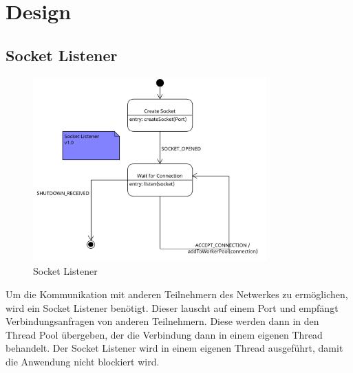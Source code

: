 \section{Design}
\subsection{Socket Listener}

\begin{figure}[H]
\centering
\includegraphics[width=0.8\textwidth]{images/socketlistener.png}
\caption{Socket Listener}
\label{fig:SocketListener}
\end{figure}

Um die Kommunikation mit anderen Teilnehmern des Netwerkes zu ermöglichen, wird ein Socket Listener benötigt. 
Dieser lauscht auf einem Port und empfängt Verbindungsanfragen von anderen Teilnehmern.
Diese werden dann in den Thread Pool übergeben, der die Verbindung dann in einem eigenen Thread behandelt.
Der Socket Listener wird in einem eigenen Thread ausgeführt, damit die Anwendung nicht blockiert wird.